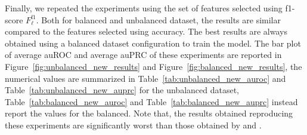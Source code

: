 Finally, we repeated the experiments using the set of features selected using f1-score $F_\ell^{\textrm{f1}}$. Both for balanced and unbalanced dataset, the results are similar compared to the features selected using accuracy. The best results are always obtained using a balanced dataset configuration to train the model. The bar plot of average auROC and average auPRC of these experiments are reported in Figure~\ref{fig:unbalanced_new_results} and Figure~\ref{fig:balanced_new_results}, the numerical values are summarized in Table~\ref{tab:unbalanced_new_auroc} and Table~\ref{tab:unbalanced_new_auprc} for the unbalanced dataset, Table~\ref{tab:balanced_new_auroc} and Table~\ref{tab:balanced_new_auprc} instead report the values for the balanced.
Note that, the results obtained reproducing these experiments are significantly worst than those obtained by \cite{WassermannDECRES} and \cite{CappelelttiPetriniSingleTask}.  

